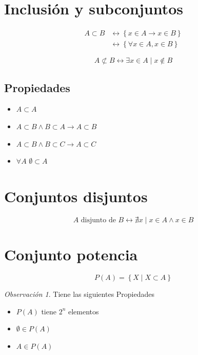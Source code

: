 \documentclass[
  16pt,
]{krantz}
\providecommand{\tightlist}{%
  \setlength{\itemsep}{0pt}\setlength{\parskip}{0pt}}
\theoremstyle{definition}
\theoremstyle{definition}
\theoremstyle{definition}
\theoremstyle{definition}
\theoremstyle{remark}
\newtheorem*{remark}{Observación}
\begin{document}
\hypertarget{inclusiuxf3n-y-subconjuntos}{%
\section{Inclusión y subconjuntos}\label{inclusiuxf3n-y-subconjuntos}}

\[
\begin{aligned}
A\subset B&\leftrightarrow\left\{x\in A\rightarrow x\in B\right\}\\
&\leftrightarrow\left\{\forall x\in A, x\in B\right\}
\end{aligned}
\]

\[
A\not\subset B\leftrightarrow\exists x\in A\;|\; x\notin B
\]

\hypertarget{propiedades-1}{%
\subsection{Propiedades}\label{propiedades-1}}

\begin{itemize}
\tightlist
\item
  \(A\subset A\)
\item
  \(A\subset B\wedge B\subset A\rightarrow A\subset B\)
\item
  \(A\subset B\wedge B\subset C\rightarrow A\subset C\)
\item
  \(\forall A\) \(\emptyset\subset A\)
\end{itemize}

\hypertarget{conjuntos-disjuntos}{%
\section{Conjuntos disjuntos}\label{conjuntos-disjuntos}}

\[
A\text{ disjunto de } B\leftrightarrow\nexists x\;|\; x\in A\wedge x\in B  
\]

\hypertarget{conjunto-potencia}{%
\section{Conjunto potencia}\label{conjunto-potencia}}

\[
P(A)=\left\{X\;|\;X\subset A\right\}
\]

\begin{remark}

Tiene las siguientes Propiedades

\begin{itemize}
\tightlist
\item
  \(P(A)\) tiene \(2^n\) elementos
\item
  \(\emptyset\in P(A)\)
\item
  \(A\in P(A)\)
\end{itemize}

\end{remark}
\end{document}
